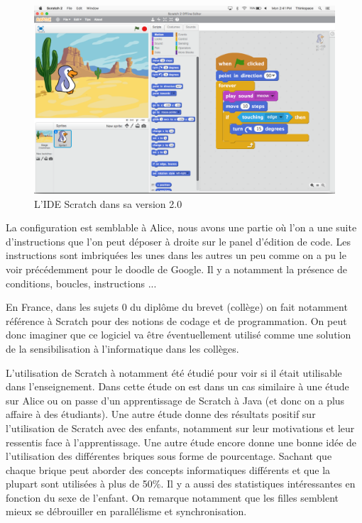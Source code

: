 \begin{figure}[!htb]
  \centering
  \includegraphics[width=125mm,scale=0.5]{images/scratch-ide.png}
  \caption{L'IDE Scratch dans sa version 2.0}
  \label{fig:boat1}
\end{figure}

La configuration est semblable à Alice, nous avons une partie où l'on a une suite d'instructions que l'on peut déposer à droite sur le panel d'édition de code. Les instructions sont imbriquées les unes dans les autres un peu comme on a pu le voir précédemment pour le doodle de Google. Il y a notamment la présence de conditions, boucles, instructions ... 

En France, dans les sujets 0 du diplôme du brevet (collège) on fait notamment référence à Scratch pour des notions de codage et de programmation. \cite{26} On peut donc imaginer que ce logiciel va être éventuellement utilisé comme une solution de la sensibilisation à l'informatique dans les collèges.

L'utilisation de Scratch à notamment été étudié \cite{27} pour voir si il était utilisable dans l'enseignement. Dans cette étude on est dans un cas similaire à une étude sur Alice ou on passe d'un apprentissage de Scratch à Java (et donc on a plus affaire à des étudiants). Une autre étude donne des résultats positif sur l'utilisation de Scratch avec des enfants, notamment sur leur motivations et leur ressentis face à l'apprentissage. \cite{36} Une autre étude encore donne une bonne idée de l'utilisation des différentes briques sous forme de pourcentage. Sachant que chaque brique peut aborder des concepts informatiques différents et que la plupart sont utilisées à plus de 50\%. Il y a aussi des statistiques intéressantes en fonction du sexe de l'enfant. On remarque notamment que les filles semblent mieux se débrouiller en parallélisme et synchronisation. \cite{37}

